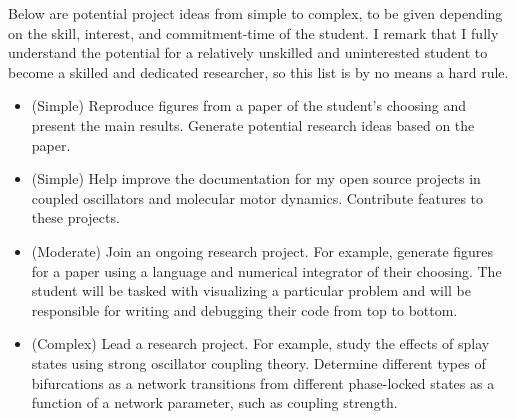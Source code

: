 \documentclass[a4paper,11pt]{article}
\begin{document}
	
	Below are potential project ideas from simple to complex, to be given depending on the skill, interest, and commitment-time of the student. I remark that I fully understand the potential for a relatively unskilled and uninterested student to become a skilled and dedicated researcher, so this list is by no means a hard rule.
	
	\begin{itemize}
		\item (Simple) Reproduce figures from a paper of the student's choosing and present the main results. Generate potential research ideas based on the paper.
		\item (Simple) Help improve the documentation for my open source projects in coupled oscillators and molecular motor dynamics. Contribute features to these projects.
		\item (Moderate) Join an ongoing research project. For example, generate figures for a paper using a language and numerical integrator of their choosing. The student will be tasked with visualizing a particular problem and will be responsible for writing and debugging their code from top to bottom.
		\item (Complex) Lead a research project. For example, study the effects of splay states using strong oscillator coupling theory. Determine different types of bifurcations as a network transitions from different phase-locked states as a function of a network parameter, such as coupling strength.
	\end{itemize}
	
	
	
	
	
	
\end{document}
